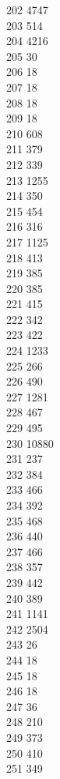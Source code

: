 { 202	4747 \\
 203	514 \\
 204	4216 \\
 205	30 \\
 206	18 \\
 207	18 \\
 208	18 \\
 209	18 \\
 210	608 \\
 211	379 \\
 212	339 \\
 213	1255 \\
 214	350 \\
 215	454 \\
 216	316 \\
 217	1125 \\
 218	413 \\
 219	385 \\
 220	385 \\
 221	415 \\
 222	342 \\
 223	422 \\
 224	1233 \\
 225	266 \\
 226	490 \\
 227	1281 \\
 228	467 \\
 229	495 \\
 230	10880 \\
 231	237 \\
 232	384 \\
 233	466 \\
 234	392 \\
 235	468 \\
 236	440 \\
 237	466 \\
 238	357 \\
 239	442 \\
 240	389 \\
 241	1141 \\
 242	2504 \\
 243	26 \\
 244	18 \\
 245	18 \\
 246	18 \\
 247	36 \\
 248	210 \\
 249	373 \\
 250	410 \\
 251	349 \\
}
